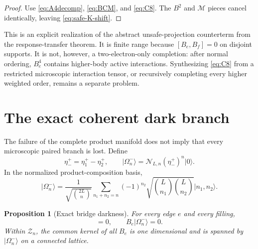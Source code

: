 \documentclass[11pt]{article}
\newtheorem{proposition}[theorem]{Proposition}
\theoremstyle{definition}
\theoremstyle{remark}
\newcommand{\cZ}{\mathcal Z}
\newcommand{\cM}{\mathcal M}
\newcommand{\ket}[1]{\lvert #1\rangle}
\begin{document}
\begin{proof}
Use \eqref{eq:A4decomp}, \eqref{eq:BCM}, and \eqref{eq:C8}.  The $B^2$ and $\cM$ pieces cancel identically, leaving \eqref{eq:safe-K-shift}.
\end{proof}

This is an explicit realization of the abstract unsafe-projection counterterm from the response-transfer theorem.  It is finite range because $[B_e,B_f]=0$ on disjoint supports.  It is not, however, a two-electron-only completion: after normal ordering, $B_e^4$ contains higher-body active interactions.  Synthesizing \eqref{eq:C8} from a restricted microscopic interaction tensor, or recursively completing every higher weighted order, remains a separate problem.

\section{The exact coherent dark branch}

The failure of the complete product manifold does not imply that every microscopic paired branch is lost.  Define
\begin{equation}
 \eta_-^+=\eta_1^+-\eta_2^+,
 \qquad
 \ket{\Omega_n^-}=\mathcal N_{L,n}(\eta_-^+)^n\ket0.
 \label{eq:dark-state}
\end{equation}
In the normalized product-composition basis,
\begin{equation}
 \ket{\Omega_n^-}
 =\frac1{\sqrt{\binom{2L}{n}}}
 \sum_{n_1+n_2=n}(-1)^{n_2}
 \sqrt{\binom{L}{n_1}\binom{L}{n_2}}
 \ket{n_1,n_2}.
 \label{eq:dark-coeff}
\end{equation}

\begin{proposition}[Exact bridge darkness]
\label{prop:dark}
For every edge $e$ and every filling,
\begin{equation}
 [B_e,\eta_-^+]=0,
 \qquad
 B_e\ket{\Omega_n^-}=0.
 \label{eq:darkness}
\end{equation}
Within $\cZ_n$, the common kernel of all $B_e$ is one dimensional and is spanned by $\ket{\Omega_n^-}$ on a connected lattice.
\end{proposition}
\end{document}
